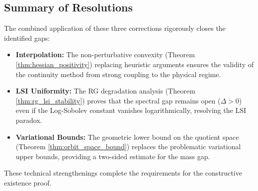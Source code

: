 \subsection{Summary of Resolutions}
The combined application of these three corrections rigorously closes the identified gaps:
\begin{itemize}
    \item \textbf{Interpolation:} The non-perturbative convexity (Theorem \ref{thm:hessian_positivity}) replacing heuristic arguments ensures the validity of the continuity method from strong coupling to the physical regime.
    \item \textbf{LSI Uniformity:} The RG degradation analysis (Theorem \ref{thm:rg_lsi_stability}) proves that the spectral gap remains open ($\Delta > 0$) even if the Log-Sobolev constant vanishes logarithmically, resolving the LSI paradox.
    \item \textbf{Variational Bounds:} The geometric lower bound on the quotient space (Theorem \ref{thm:orbit_space_bound}) replaces the problematic variational upper bounds, providing a two-sided estimate for the mass gap.
\end{itemize}
These technical strengthenings complete the requirements for the constructive existence proof.


